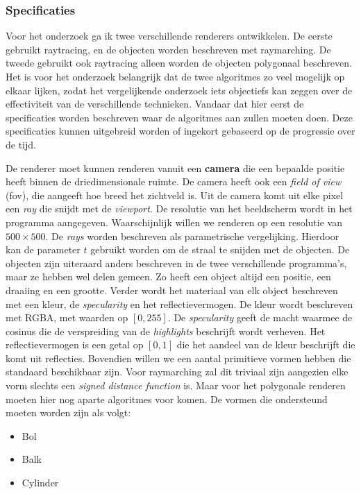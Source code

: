\documentclass[12pt, a4paper]{article}
\begin{document}
\subsubsection{Specificaties}
Voor het onderzoek ga ik twee verschillende renderers ontwikkelen. De eerste gebruikt raytracing, en de objecten worden beschreven met raymarching. De tweede gebruikt ook raytracing alleen worden de objecten polygonaal beschreven. Het is voor het onderzoek belangrijk dat de twee algoritmes zo veel mogelijk op elkaar lijken, zodat het vergelijkende onderzoek iets objectiefs kan zeggen over de effectiviteit van de verschillende technieken. Vandaar dat hier eerst de specificaties worden beschreven waar de algoritmes aan zullen moeten doen. Deze specificaties kunnen uitgebreid worden of ingekort gebaseerd op de progressie over de tijd.

De renderer moet kunnen renderen vanuit een \textbf{camera} die een bepaalde positie heeft binnen de driedimensionale ruimte. De camera heeft ook een \emph{field of view} (fov), die aangeeft hoe breed het zichtveld is. Uit de camera komt uit elke pixel een \emph{ray} die snijdt met de \emph{viewport}. De resolutie van het beeldscherm wordt in het programma aangegeven. Waarschijnlijk willen we renderen op een resolutie van \(500\times 500\). De \emph{rays} worden beschreven als parametrische vergelijking. Hierdoor kan de parameter \(t\) gebruikt worden om de straal te snijden met de objecten. De objecten zijn uiteraard anders beschreven in de twee verschillende programma's, maar ze hebben wel delen gemeen. Zo heeft een object altijd een positie, een draaiing en een grootte. Verder wordt het materiaal van elk object beschreven met een kleur, de \emph{specularity} en het reflectievermogen. De kleur wordt beschreven met RGBA, met waarden op \([0, 255]\). De \emph{specularity} geeft de macht waarmee de cosinus die de verspreiding van de \emph{highlights} beschrijft wordt verheven. Het reflectievermogen is een getal op \([0, 1]\) die het aandeel van de kleur beschrijft die komt uit reflecties. Bovendien willen we een aantal primitieve vormen hebben die standaard beschikbaar zijn. Voor raymarching zal dit triviaal zijn aangezien elke vorm slechts een \emph{signed distance function} is. Maar voor het polygonale renderen moeten hier nog aparte algoritmes voor komen. De vormen die ondersteund moeten worden zijn als volgt:
\begin{itemize}
	\item Bol
	\item Balk
	\item Cylinder
\end{itemize}
\end{document}
